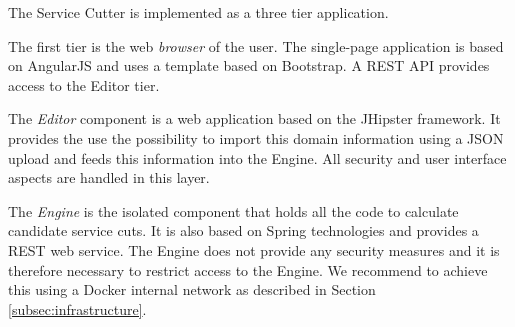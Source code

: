 \begin{minipage}[t]{0.5\textwidth}
\setlength{\parskip}{5pt plus 0.1pt}
	The Service Cutter is implemented as a three tier application.
	
	The first tier is the web \textit{browser} of the user. The single-page application is based on AngularJS\cite{angularjs} and uses a template based on Bootstrap\cite{bootstrap}. A REST API provides access to the Editor tier.
	
	The \textit{Editor} component is a web application based on the JHipster\cite{jhipster} framework. It provides the use the possibility to import this domain information using a JSON upload and feeds this information into the Engine. All security and user interface aspects are handled in this layer.
	
	The \textit{Engine} is the isolated component that holds all the code to calculate candidate service cuts. It is also based on Spring technologies and provides a REST web service. The Engine does not provide any security measures and it is therefore necessary to restrict access to the Engine. We recommend to achieve this using a Docker\cite{docker} internal network as described in Section \ref{subsec:infrastructure}.
	
	
\end{minipage}
